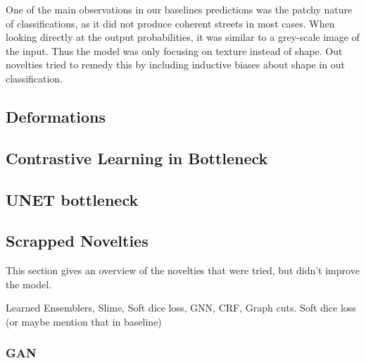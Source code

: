 One of the main observations in our baselines predictions was the patchy nature of classifications, as it did not produce coherent streets in most cases. When looking directly at the output probabilities, it was similar to a grey-scale image of the input. Thus the model was only focusing on texture instead of shape. Out novelties tried to remedy this by including inductive biases about shape in out classification.

\subsection{Deformations}

\subsection{Contrastive Learning in Bottleneck}

\subsection{UNET bottleneck}


\subsection{Scrapped Novelties}
    This section gives an overview of the novelties that were tried, but didn't improve the model.

    Learned Ensemblers, Slime, Soft dice loss, GNN, CRF, Graph cuts. Soft dice loss (or maybe mention that in baseline)

    \subsubsection{GAN}
    
